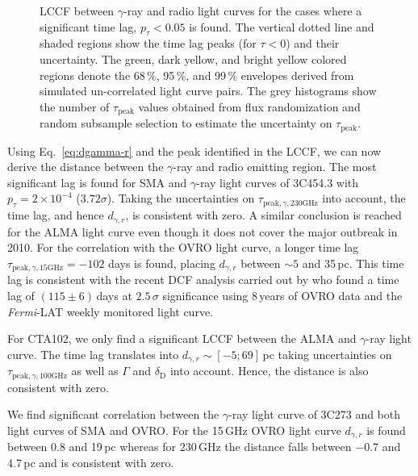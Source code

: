 \documentclass[twocolumn,linenumbers]{aastex62}
\newcommand{\gray}{$\gamma$-ray\xspace}
\newcommand{\fermiLAT}{\emph{Fermi}-LAT\xspace}
\begin{document}
\begin{figure}
    \caption{LCCF between \gray and radio light curves for the cases where a significant time lag, $p_\tau < 0.05$ is found. The vertical dotted line and shaded regions show the time lag peaks (for $\tau < 0$) and their uncertainty. 
    The green, dark yellow, and bright yellow colored regions denote the 68\,\%, 95\,\%, and 99\,\% envelopes derived from simulated un-correlated light curve pairs. 
    The grey histograms show the number of $\tau_\mathrm{peak}$ values obtained from flux randomization and random subsample selection to estimate the uncertainty on $\tau_\mathrm{peak}$.}
    \label{fig:lccf}
\end{figure}

Using Eq.~\ref{eq:dgamma-r} and the peak identified in the LCCF, we can now derive the distance between the \gray and radio emitting region. 
The most significant lag is found for SMA and \gray light curves of 3C454.3 with $p_\tau = 2\times10^{-4}$ ($3.72\sigma$). 
Taking the uncertainties on $\tau_{\mathrm{peak},\gamma,230\mathrm{GHz}}$ into account, 
the time lag, and hence $d_{\gamma,r}$, is consistent with zero.
A similar conclusion is reached for the ALMA light curve even though it does not cover the major outbreak in 2010. 
For the correlation with the OVRO light curve, a longer time lag $\tau_{\mathrm{peak},\gamma,15\mathrm{GHz}} = -102$ days is found, placing $d_{\gamma,r}$ between $\sim 5$ and 35\,pc.
This time lag is consistent with the recent DCF analysis carried out by \citet{2018MNRAS.480.5517L} who found a time lag of $(115\pm6)$\,days at $2.5\,\sigma$ significance using 8\,years of OVRO data and the \fermiLAT weekly monitored light curve. 

For CTA102, we only find a significant LCCF between the ALMA and \gray light curve. 
The time lag translates into $d_{\gamma,r} \sim [-5;69]\,$pc taking uncertainties on $\tau_{\mathrm{peak},\gamma,100\mathrm{GHz}}$ as well as $\Gamma$ and $\delta_\mathrm{D}$ into account.
Hence, the distance is also consistent with zero. 

We find significant correlation between the \gray light curve of 3C273 and both light curves of SMA and OVRO. 
For the 15\,GHz OVRO light curve $d_{\gamma,r}$ is found between 0.8 and 19\,pc whereas for 230\,GHz the distance falls between $-0.7$ and 4.7\,pc and is consistent with zero. 
\end{document}
